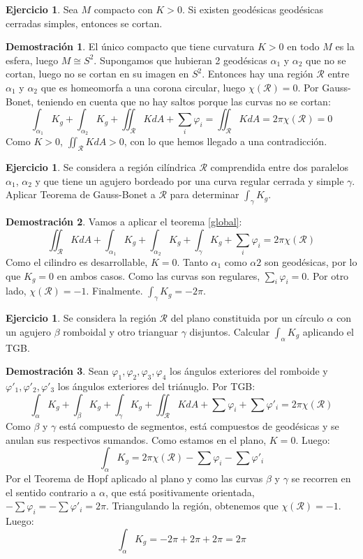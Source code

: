 \documentclass[twoside]{report}
\theoremstyle{definition}
\newtheorem{ejer}[theorem]{Ejercicio}
\newtheorem*{dem}{Demostración}
\numberwithin{equation}{section}
\begin{document}
\begin{ejer} Sea $M$ compacto con $K > 0$. Si existen geodésicas geodésicas cerradas simples, entonces se cortan.
\end{ejer}

\begin{dem} El único compacto que tiene curvatura $K > 0$ en todo $M$ es la esfera, luego $M \cong S^2$. Supongamos que hubieran 2 geodésicas $α_1$ y $α_2$ que no se cortan, luego no se cortan en su imagen en $S^2$. Entonces hay una región $\mathcal{R}$ entre $α_1$ y $α_2$ que es homeomorfa a una corona circular, luego $χ(\mathcal{R}) = 0$. Por Gauss-Bonet, teniendo en cuenta que no hay saltos porque las curvas no se cortan:
\[ \int_{α_1} K_g + \int_{α_2} K_g + \iint_\mathcal{R} K dA + \sum_i φ_i = \iint_\mathcal{R} K dA = 2 π χ(\mathcal{R}) = 0 \]
Como $K > 0$, $\iint_\mathcal{R} K dA > 0$, con lo que hemos llegado a una contradicción.
\end{dem}

\begin{ejer} Se considera a región cilíndrica $\mathcal{R}$ comprendida entre dos paralelos $α_1$, $α_2$ y que tiene un agujero bordeado por una curva regular cerrada y simple $γ$. Aplicar Teorema de Gauss-Bonet a $\mathcal{R}$ para determinar $\int_γ K_g$.
\end{ejer}

\begin{dem}
Vamos a aplicar el teorema \ref{global}:
\[ \iint_\mathcal{R} KdA + \int_{α_1} K_g + \int_{α_2} K_g + \int_γ K_g + \sum_i φ_i = 2 π χ(\mathcal{R}) \]
Como el cilindro es desarrollable, $K=0$. Tanto $\alpha_1$ como $\alpha2$ son geodésicas, por lo que $K_g=0$ en ambos casos. Como las curvas son regulares, $\sum_i φ_i=0$. Por otro lado, $χ(\mathcal{R})=-1$. Finalmente. $\int_γ K_g =-2\pi$. 
\end{dem}

\begin{ejer}
Se considera la región $\mathcal{R}$ del plano constituida por un círculo $α$ con un agujero $β$ romboidal y otro trianguar $γ$ disjuntos. Calcular $\int_α K_g$ aplicando el TGB.
\end{ejer}

\begin{dem} Sean $φ_1,φ_2,φ_3,φ_4$ los ángulos exteriores del romboide y  $φ'_1,φ'_2,φ'_3$ los ángulos exteriores del triánuglo. Por TGB:
\[ \int_α K_g + \int_β K_g + \int_γ K_g + \iint_\mathcal{R} K dA + \sum φ_i + \sum φ'_i = 2 π χ(\mathcal{R}) \]
Como $β$ y $γ$ está compuesto de segmentos, está compuestos de geodésicas y se anulan sus respectivos sumandos. Como estamos en el plano, $K = 0$. Luego:
\[ \int_α K_g = 2 π χ(\mathcal{R}) - \sum φ_i - \sum φ'_i \]
Por el Teorema de Hopf aplicado al plano y como las curvas $β$ y $γ$ se recorren en el sentido contrario a $α$, que está positivamente orientada, $-\sum φ_i = -\sum φ'_i = 2π$. Triangulando la región, obtenemos que $χ(\mathcal{R})=-1$. Luego:
\[ \int_α K_g = -2π+2π+2π = 2π \]
\end{dem}
\end{document}
